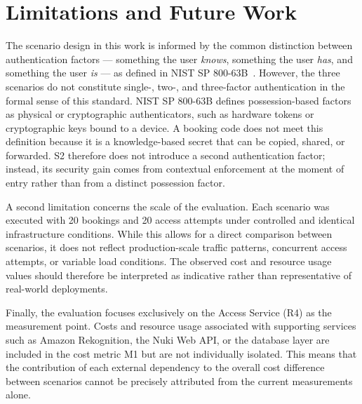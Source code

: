 \section{Limitations and Future Work}

The scenario design in this work is informed by the common distinction between authentication factors — something the user \textit{knows}, something the user \textit{has}, and something the user \textit{is} — as defined in NIST SP 800-63B~\cite{nist80063b}. However, the three scenarios do not constitute single-, two-, and three-factor authentication in the formal sense of this standard. NIST SP 800-63B defines possession-based factors as physical or cryptographic authenticators, such as hardware tokens or cryptographic keys bound to a device. A booking code does not meet this definition because it is a knowledge-based secret that can be copied, shared, or forwarded. S2 therefore does not introduce a second authentication factor; instead, its security gain comes from contextual enforcement at the moment of entry rather than from a distinct possession factor.

A second limitation concerns the scale of the evaluation. Each scenario was executed with 20 bookings and 20 access attempts under controlled and identical infrastructure conditions. While this allows for a direct comparison between scenarios, it does not reflect production-scale traffic patterns, concurrent access attempts, or variable load conditions. The observed cost and resource usage values should therefore be interpreted as indicative rather than representative of real-world deployments.

Finally, the evaluation focuses exclusively on the Access Service (R4) as the measurement point. Costs and resource usage associated with supporting services such as Amazon Rekognition, the Nuki Web API, or the database layer are included in the cost metric M1 but are not individually isolated. This means that the contribution of each external dependency to the overall cost difference between scenarios cannot be precisely attributed from the current measurements alone.
